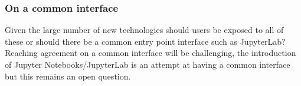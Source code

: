 \subsubsection*{On a common interface}

Given the large number of new technologies should users be exposed to all of these or should there be a common entry point interface such as JupyterLab? Reaching agreement on a common interface will be challenging, the introduction of Jupyter Notebooks/JupyterLab is an attempt at having a common interface but this remains an open question. 


